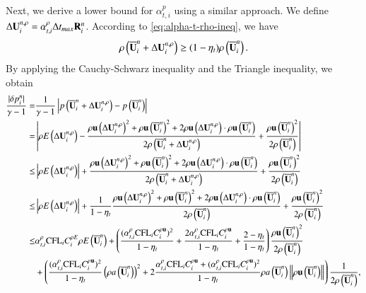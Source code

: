 \newcommand{\uincT}{\inc\U_i^{n,\rho}}
Next, we derive a lower bound for $\alpha_{t,i}^{p}$ using a similar approach.
We define $\mathrm\Delta\mathbf{U}_i^{n,\rho} =\alpha_{t,i}^{\rho} \mathrm\Delta t_{max} \mathbf{R}^n_i$.
According to \eqref{eq:alpha-t-rho-ineq}, we have 
\begin{equation}
    \rho\left(\UM^n_i+\uincT  \right) \geq (1-\eta_t)\rho\left(\UM^n_i\right).
\end{equation}
By applying the Cauchy-Schwarz inequality and the Triangle inequality, we obtain
\begin{equation}
    \begin{aligned}
        \dfrac{|\delta p_i^n|}{\gamma-1} 
        = & \dfrac{1}{\gamma-1} \left| p \left(\UM^n_i + \inc\U_i^{n,\rho}\right) -  p \left(\UM^n_i\right) \right| \\
        = & \left| \rho E\left( \uincT \right) 
         - \frac{
         \rho\uv\left(\uincT\right)^2
         +
         \rho\uv\left(\UM^n_i\right)^2
         +
         2\rho\uv\left(\uincT\right)\cdot\rho\uv\left(\UM^n_i\right)
         }{
         2\rho\left(\UM^n_i+\uincT  \right)
         }
         + \frac{ \rho\uv\left(\UM^n_i\right)^2}{2\rho\left(\UM^n_i\right)}
        \right| \\
        \leq & \left| \rho E\left( \uincT \right) \right|
         +
         \dfrac{
         \rho\uv\left(\uincT\right)^2
         +
         \rho\uv\left(\UM^n_i\right)^2
         +
         2\rho\uv\left(\uincT\right)\cdot\rho\uv\left(\UM^n_i\right)
         }{
         2\rho\left(\UM^n_i+\uincT  \right)
         }
         +
          \frac{ \rho\uv\left(\UM^n_i\right)^2}{2\rho\left(\UM^n_i\right)} \\
        \leq &  \left| \rho E\left( \uincT \right) \right|
         +
         \frac{1}{1-\eta_t}
         \frac{
         \rho\uv\left(\uincT\right)^2
         +
         \rho\uv\left(\UM^n_i\right)^2
         +
         2\rho\uv\left(\uincT\right)\cdot\rho\uv\left(\UM^n_i\right)
         }{
         2\rho\left(\UM^n_i \right)
         }
         +
          \frac{ \rho\uv\left(\UM^n_i\right)^2}{2\rho\left(\UM^n_i\right)} \\
        \leq & \alpha_{t,i}^\rho\CFL_i C^{\rho E}_i  \rho E\left( \UM^n_i \right) 
        +\left(
        \frac{(\alpha_{t,i}^\rho\CFL_i C^{\rho \uv}_i)^2}{1-\eta_t}
        +\frac{2\alpha_{t,i}^\rho\CFL_i C^{\rho \uv}_i}{1-\eta_t}
        + \frac{2-\eta_t}{1-\eta_t}
        \right)
        \frac{ \rho\uv\left(\UM^n_i\right)^2}{2\rho\left(\UM^n_i\right)}
        \\  & +
        \left(
        \frac{(\alpha_{t,i}^\rho\CFL_i C^{\rho \uv}_i)^2}
        {1-\eta_t}
        \left(\rho a\left( \UM^n_i \right)\right)^2
        +
        2 
        \frac{\alpha_{t,i}^\rho\CFL_i C^{\rho \uv}_i + (\alpha_{t,i}^\rho\CFL_i C^{\rho \uv}_i)^2
       }
       {1-\eta_t}
        \rho a\left( \UM^n_i \right)
        \left\| \rho\uv\left(\UM^n_i\right) \right\|
        \right)
        \frac{1}{2\rho\left(\UM^n_i\right)}
        ,
    \end{aligned}
\end{equation}
